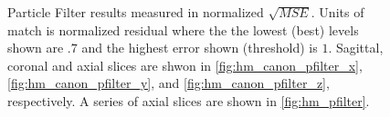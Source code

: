 \begin{figure}[H]
\caption{Particle Filter results measured in normalized $\sqrt{MSE}$. 
        Units of match is normalized residual where the  the lowest (best) levels shown are
        $.7$ and the highest error shown (threshold) is $1$.
        Sagittal, coronal and axial slices are shwon in \autoref{fig:hm_canon_pfilter_x},
        \autoref{fig:hm_canon_pfilter_y}, and 
         \autoref{fig:hm_canon_pfilter_z}, respectively. A series of axial slices are shown in
         \autoref{fig:hm_pfilter}.  }
\label{fig:hm_canon_pfilter}
\end{figure}

